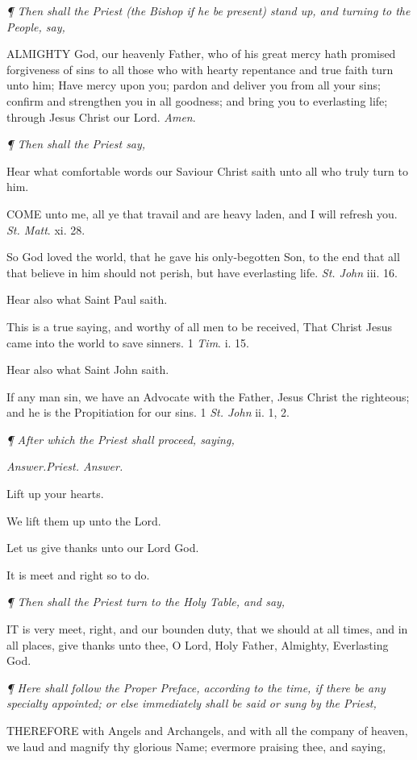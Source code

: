 \emph{¶
Then shall the Priest (the Bishop if he be present) stand up, and turning
to the People, say,}

ALMIGHTY
God, our heavenly Father, who of his great mercy hath promised forgiveness
of sins to all those who with hearty repentance and true faith turn unto
him; Have mercy upon you; pardon and deliver you from all your sins; confirm
and strengthen you in all goodness; and bring you to everlasting life;
through Jesus Christ our Lord. \emph{Amen}.

\emph{¶
Then shall the Priest say,}

Hear what comfortable words our Saviour Christ saith unto all who truly
turn to him.

COME
unto me, all ye that travail and are heavy laden, and I will refresh you.
\emph{St. Matt}. xi. 28.

So God loved the world, that he gave his only-begotten Son, to the end
that all that believe in him should not perish, but have everlasting life.
\emph{St. John} iii. 16.

Hear also what Saint Paul saith.

This is a true saying, and worthy of all men to be received, That Christ
Jesus came into the world to save sinners. 1 \emph{Tim}. i. 15.

Hear also what Saint John saith.

If any man sin, we have an Advocate with the Father, Jesus Christ the
righteous; and he is the Propitiation for our sins. 1 \emph{St. John}
ii. 1, 2.

\emph{¶
After which the Priest shall proceed, saying,}

\emph{Answer.}\emph{Priest. Answer.}

Lift
up your hearts.

We lift them up unto the Lord. 

Let us give thanks unto our Lord God. 

It is meet and right so to do.

\emph{¶
Then shall the Priest turn to the Holy Table, and say,}

IT
is very meet, right, and our bounden duty, that we should at all times,
and in all places, give thanks unto thee, O Lord, Holy Father, Almighty,
Everlasting God.

\emph{¶ Here shall follow the Proper Preface, according to the time,
if there be any specialty appointed; or else immediately shall be said
or sung by the Priest,}

THEREFORE
with Angels and Archangels, and with all the company of heaven, we laud
and magnify thy glorious Name; evermore praising thee, and saying,

